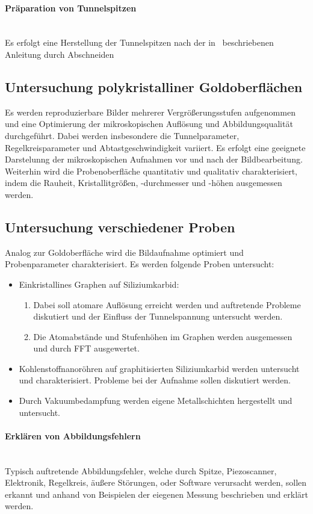 \documentclass[a4paper,twoside,final]{article}
\begin{document}
\paragraph*{Präparation von Tunnelspitzen}$~$\\
Es erfolgt eine Herstellung der Tunnelspitzen nach der in~\cite{Nanosurf} beschriebenen Anleitung durch Abschneiden
\subsection{Untersuchung polykristalliner Goldoberflächen}
Es werden reproduzierbare Bilder mehrerer Vergrößerungsstufen aufgenommen und eine Optimierung der mikroskopischen Auflösung und Abbildungsqualität durchgeführt. Dabei werden insbesondere die Tunnelparameter, Regelkreisparameter und Abtastgeschwindigkeit variiert. Es erfolgt eine geeignete Darstelunng der mikroskopischen Aufnahmen vor und nach der Bildbearbeitung.\\
Weiterhin wird die Probenoberfläche quantitativ und qualitativ charakterisiert, indem die Rauheit, Kristallitgrößen, -durchmesser und -höhen ausgemessen werden.
\subsection{Untersuchung verschiedener Proben}
Analog zur Goldoberfläche wird die Bildaufnahme optimiert und Probenparameter charakterisiert. Es werden folgende Proben untersucht:
\begin{itemize}
  \item Einkristallines Graphen auf Siliziumkarbid:
  \begin{enumerate}
    \item Dabei soll atomare Auflösung erreicht werden und auftretende Probleme diskutiert und der Einfluss der Tunnelspannung untersucht werden.
    \item Die Atomabstände und Stufenhöhen im Graphen werden ausgemessen und durch FFT ausgewertet.
  \end{enumerate}
  \item Kohlenstoffnanoröhren auf graphitisierten Siliziumkarbid werden untersucht und charakterisiert. Probleme bei der Aufnahme sollen diskutiert werden.
  \item Durch Vakuumbedampfung werden eigene Metallschichten hergestellt und untersucht.
\end{itemize}

\paragraph{Erklären von Abbildungsfehlern}$~$\\
Typisch auftretende Abbildungsfehler, welche durch Spitze, Piezoscanner, Elektronik, Regelkreis, äußere Störungen, oder Software verursacht werden, sollen erkannt und anhand von Beispielen der eiegenen Messung beschrieben und erklärt werden.
\end{document}
